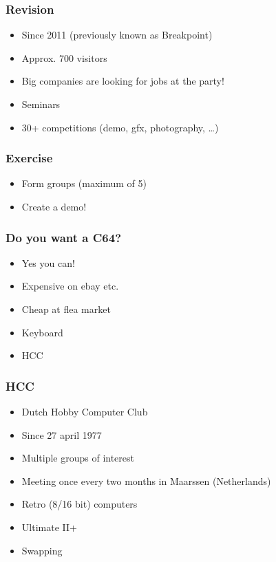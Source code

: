 \documentclass[aspectratio=43]{uva-inf-presentation}
\begin{document}

\begin{frame}
\frametitle{Revision}

\begin{itemize}
\item Since 2011 (previously known as Breakpoint)
\item Approx. 700 visitors
\item Big companies are looking for jobs at the party!
\item Seminars
\item 30+ competitions (demo, gfx, photography, \dots)
\end{itemize}

\end{frame}


\begin{frame}
\frametitle{Exercise}

\begin{itemize}
\item Form groups (maximum of 5)
\item Create a demo!
\end{itemize}

\end{frame}


\begin{frame}
\frametitle{Do you want a C64?}

\begin{itemize}
\item Yes you can!
\item Expensive on ebay etc.
\item Cheap at flea market
\item Keyboard
\item HCC
\end{itemize}

\end{frame}


\begin{frame}
\frametitle{HCC}

\begin{itemize}
\item Dutch Hobby Computer Club
\item Since 27 april 1977
\item Multiple groups of interest
\item Meeting once every two months in Maarssen (Netherlands)
\item Retro (8/16 bit) computers
\item Ultimate II+
\item Swapping
\end{itemize}

\end{frame}
\end{document}
